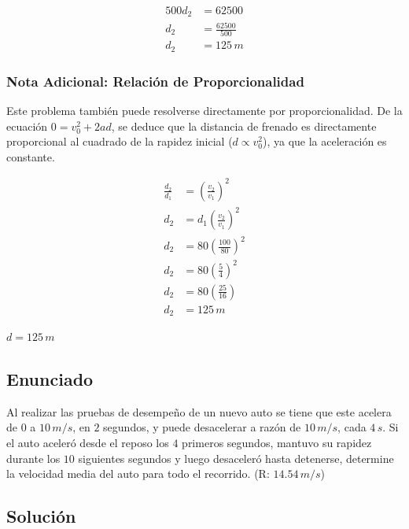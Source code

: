 \documentclass[12pt, a4paper]{article}
\begin{document}
\begin{align*}
500 d_2 &= 62500 \\
d_2 &= \frac{62500}{500} \\
d_2 &= 125 \, \si{m}
\end{align*}

\subsubsection*{Nota Adicional: Relación de Proporcionalidad}
Este problema también puede resolverse directamente por proporcionalidad. De la ecuación $0 = v_0^2 + 2ad$, se deduce que la distancia de frenado es directamente proporcional al cuadrado de la rapidez inicial ($d \propto v_0^2$), ya que la aceleración es constante.

\begin{align*}
\frac{d_2}{d_1} &= \left( \frac{v_2}{v_1} \right)^2 \\
d_2 &= d_1 \left( \frac{v_2}{v_1} \right)^2 \\
d_2 &= 80 \left( \frac{100}{80} \right)^2 \\
d_2 &= 80 \left( \frac{5}{4} \right)^2 \\
d_2 &= 80 \left( \frac{25}{16} \right) \\
d_2 &= 125 \, \si{m}
\end{align*}

\begin{tcolorbox}[colback=green!5!white, colframe=green!50!black, title=Respuesta Final]
\centering \Large $d = 125 \, \si{m}$
\end{tcolorbox}

\newpage

\subsection*{Enunciado}
Al realizar las pruebas de desempeño de un nuevo auto se tiene que este acelera de $0$ a $10 \, \si{m/s}$, en $2$ segundos, y puede desacelerar a razón de $10 \, \si{m/s}$, cada $4 \, \si{s}$. Si el auto aceleró desde el reposo los $4$ primeros segundos, mantuvo su rapidez durante los $10$ siguientes segundos y luego desaceleró hasta detenerse, determine la velocidad media del auto para todo el recorrido. (R: $14.54 \, \si{m/s}$)

\subsection*{Solución}
\end{document}
